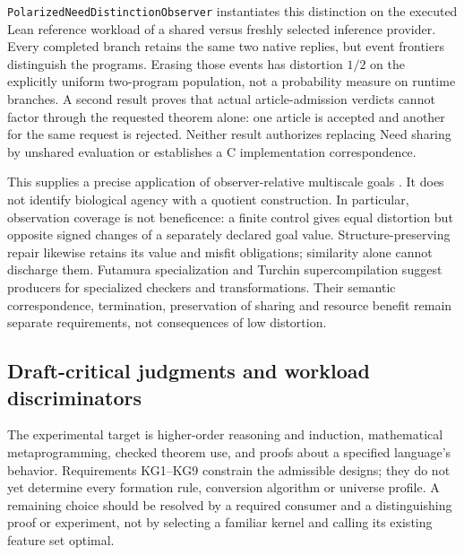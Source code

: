 \documentclass[11pt]{article}
\theoremstyle{definition}
\theoremstyle{remark}
\begin{document}
\nolinkurl{PolarizedNeedDistinctionObserver} instantiates this distinction
on the executed Lean reference workload of a shared versus freshly selected
inference provider. Every completed branch retains the same two native
replies, but event frontiers distinguish the programs. Erasing those events
has distortion $1/2$ on the explicitly uniform two-program population,
not a probability measure on runtime branches. A second result proves
that actual article-admission verdicts cannot factor through the requested
theorem alone: one article is accepted and another for the same request is
rejected. Neither result authorizes replacing Need sharing by unshared
evaluation or establishes a C implementation correspondence.

This supplies a precise application of observer-relative multiscale goals
\cite{FieldsLevinCompetency}. It does not identify biological agency with
a quotient construction. In particular, observation coverage is not
beneficence: a finite control gives equal distortion but opposite signed
changes of a separately declared goal value. Structure-preserving repair
likewise retains its value and misfit obligations; similarity alone cannot
discharge them. Futamura specialization and Turchin supercompilation
\cite{FutamuraRevisited,TurchinSupercompiler} suggest producers for
specialized checkers and transformations. Their semantic correspondence,
termination, preservation of sharing and resource benefit remain separate
requirements, not consequences of low distortion.

\subsection{Draft-critical judgments and workload discriminators}
\label{sec:draft-critical-judgments}

The experimental target is higher-order reasoning and induction, mathematical
metaprogramming, checked theorem use, and proofs about a specified language's
behavior. Requirements KG1--KG9 constrain the admissible designs; they do not
yet determine every formation rule, conversion algorithm or universe profile.
A remaining choice should be resolved by a required consumer and a
distinguishing proof or experiment, not by selecting a familiar kernel and
calling its existing feature set optimal.
\end{document}
